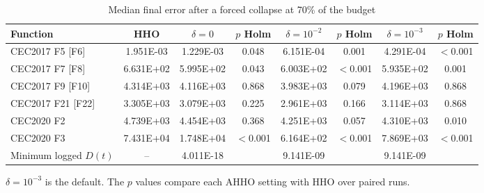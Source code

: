 \begin{table}[htbp]
\caption{Median final error after a forced collapse at 70\% of the budget}\label{tab:collapse}
\centering
\small
\begin{tabular}{lccccccc}
\toprule
Function & HHO & $\delta=0$ & $p$ Holm & $\delta=10^{-2}$ & $p$ Holm & $\delta=10^{-3}$ & $p$ Holm \\
\midrule
CEC2017 F5 [F6] & 1.951E-03 & 1.229E-03 & 0.048 & 6.151E-04 & 0.001 & 4.291E-04 & $<$0.001 \\
CEC2017 F7 [F8] & 6.631E+02 & 5.995E+02 & 0.043 & 6.003E+02 & $<$0.001 & 5.935E+02 & 0.001 \\
CEC2017 F9 [F10] & 4.314E+03 & 4.116E+03 & 0.868 & 3.983E+03 & 0.079 & 4.196E+03 & 0.868 \\
CEC2017 F21 [F22] & 3.305E+03 & 3.079E+03 & 0.225 & 2.961E+03 & 0.166 & 3.114E+03 & 0.868 \\
CEC2020 F2 & 4.739E+03 & 4.454E+03 & 0.368 & 4.251E+03 & 0.057 & 4.310E+03 & 0.010 \\
CEC2020 F3 & 7.431E+04 & 1.748E+04 & $<$0.001 & 6.164E+02 & $<$0.001 & 7.869E+03 & $<$0.001 \\
\midrule
Minimum logged $D(t)$ & -- & 4.011E-18 & & 9.141E-09 & & 9.141E-09 & \\
\bottomrule
\end{tabular}
\vspace{2pt}

{\small $\delta=10^{-3}$ is the default. The $p$ values compare each AHHO setting with HHO over paired runs.}
\end{table}
